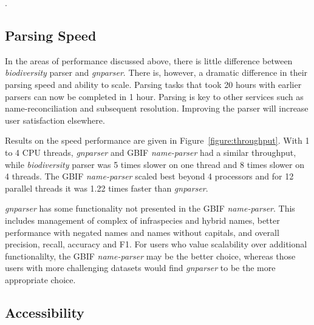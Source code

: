 \documentclass{bmcart}
\begin{document}


\cite{gnparser-json}.

\subsection*{Parsing Speed}

In the areas of performance discussed above, there is little difference
between \textit{biodiversity} parser and \textit{gnparser}. There is, however,
a dramatic difference in their parsing speed and ability to scale. Parsing tasks that took 20 hours with earlier parsers can now be completed in 1 hour. Parsing is key to other services
such as name-reconciliation and subsequent resolution. Improving the parser will increase user
satisfaction elsewhere.

Results on the speed performance are given in Figure~\ref{figure:throughput}.
With 1 to 4 CPU threads, \textit{gnparser} and GBIF \textit{name-parser} had a
similar throughput, while \textit{biodiversity} parser was 5 times slower on
one thread and  8 times slower on 4 threads. The GBIF \textit{name-parser}
scaled best beyond 4 processors and for 12 parallel threads it was 1.22 times
faster than \textit{gnparser}.  

\textit{gnparser} has some functionality not presented in the GBIF
\textit{name-parser}. This includes management of complex of infraspecies and
hybrid names, better performance with negated names and names without capitals,
and overall precision, recall, accuracy and F1.  For users who value
scalability over additional functionalilty, the GBIF \textit{name-parser} may be
the better choice, whereas those users with more challenging datasets would find \textit{gnparser} to be the more appropriate choice.

\subsection*{Accessibility}
\end{document}
